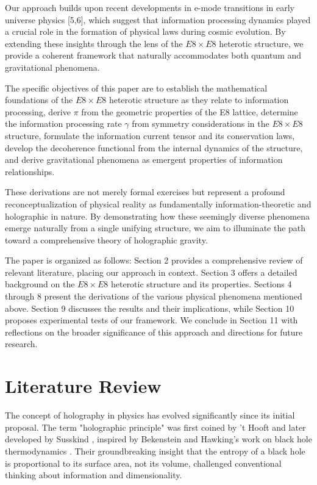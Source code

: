 \documentclass[11pt,english,twoside]{article}
\begin{document}
Our approach builds upon recent developments in e-mode transitions in early universe physics [5,6], which suggest that information processing dynamics played a crucial role in the formation of physical laws during cosmic evolution. By extending these insights through the lens of the $E8\times E8$ heterotic structure, we provide a coherent framework that naturally accommodates both quantum and gravitational phenomena.

The specific objectives of this paper are to establish the mathematical foundations of the $E8\times E8$ heterotic structure as they relate to information processing, derive $\pi$ from the geometric properties of the E8 lattice, determine the information processing rate $\gamma$ from symmetry considerations in the $E8\times E8$ structure, formulate the information current tensor and its conservation laws, develop the decoherence functional from the internal dynamics of the structure, and derive gravitational phenomena as emergent properties of information relationships.

These derivations are not merely formal exercises but represent a profound reconceptualization of physical reality as fundamentally information-theoretic and holographic in nature. By demonstrating how these seemingly diverse phenomena emerge naturally from a single unifying structure, we aim to illuminate the path toward a comprehensive theory of holographic gravity.

The paper is organized as follows: Section 2 provides a comprehensive review of relevant literature, placing our approach in context. Section 3 offers a detailed background on the $E8\times E8$ heterotic structure and its properties. Sections 4 through 8 present the derivations of the various physical phenomena mentioned above. Section 9 discusses the results and their implications, while Section 10 proposes experimental tests of our framework. We conclude in Section 11 with reflections on the broader significance of this approach and directions for future research.

\section{Literature Review}

The concept of holography in physics has evolved significantly since its initial proposal. The term "holographic principle" was first coined by 't Hooft \cite{tHooft1993} and later developed by Susskind \cite{Susskind1995}, inspired by Bekenstein and Hawking's work on black hole thermodynamics \cite{Bekenstein1972, Hawking1975}. Their groundbreaking insight that the entropy of a black hole is proportional to its surface area, not its volume, challenged conventional thinking about information and dimensionality.
\end{document}
